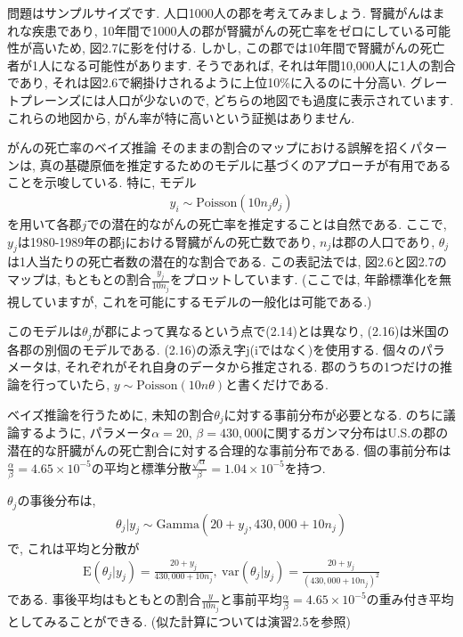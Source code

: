 \documentclass[10pt,dvipdfmx,a4]{beamer}
\newcommand{\eq}[1]{\begin{align}#1\end{align}}
\newcommand{\eqn}[1]{\begin{align*}#1\end{align*}}
\begin{document}
\begin{frame}
問題はサンプルサイズです.
人口1000人の郡を考えてみましょう.
腎臓がんはまれな疾患であり, 10年間で1000人の郡が腎臓がんの死亡率をゼロにしている可能性が高いため,  図2.7に影を付ける.
しかし, この郡では10年間で腎臓がんの死亡者が1人になる可能性があります.
そうであれば, それは年間10,000人に1人の割合であり, それは図2.6で網掛けされるように上位10\%に入るのに十分高い.
グレートプレーンズには人口が少ないので, どちらの地図でも過度に表示されています.
これらの地図から, がん率が特に高いという証拠はありません.
\end{frame}


\begin{frame}{がんの死亡率のベイズ推論}
そのままの割合のマップにおける誤解を招くパターンは, 真の基礎原価を推定するためのモデルに基づくのアプローチが有用であることを示唆している.
特に, モデル
\eq{y_i\sim\text{Poisson}(10n_j\theta_j)}
を用いて各郡$j$での潜在的ながんの死亡率を推定することは自然である.
ここで, $y_j$は1980-1989年の郡jにおける腎臓がんの死亡数であり, $n_j$は郡の人口であり, $\theta_j$は1人当たりの死亡者数の潜在的な割合である.
この表記法では, 図2.6と図2.7のマップは, もともとの割合$\frac{y_j}{10n_j}$をプロットしています.
(ここでは, 年齢標準化を無視していますが, これを可能にするモデルの一般化は可能である.)

このモデルは$\theta_j$が郡によって異なるという点で(2.14)とは異なり, (2.16)は米国の各郡の別個のモデルである.
(2.16)の添え字j(iではなく)を使用する.
個々のパラメータは, それぞれがそれ自身のデータから推定される.
郡のうちの1つだけの推論を行っていたら, $y\sim\text{Poisson}(10n\theta)$と書くだけである.
\end{frame}


\begin{frame}
ベイズ推論を行うために, 未知の割合$\theta_j$に対する事前分布が必要となる.
のちに議論するように, パラメータ$\alpha=20$, $\beta=430,000$に関するガンマ分布はU.S.の郡の潜在的な肝臓がんの死亡割合に対する合理的な事前分布である.
個の事前分布は$\tfrac{\alpha}{\beta}=4.65\times 10^{-5}$の平均と標準分散$\tfrac{\sqrt{\alpha}}{\beta}=1.04\times10^{-5}$を持つ.

$\theta_j$の事後分布は,
\eqn{\theta_j|y_j\sim\text{Gamma}(20+y_j,430,000+10n_j)}
で, これは平均と分散が
\eqn{\text{E}(\theta_j|y_j)=\frac{20+y_j}{430,000+10n_j},\ \text{var}(\theta_j|y_j)=\frac{20+y_j}{(430,000+10n_j)^2}}
である.
事後平均はもともとの割合$\tfrac{y}{10n_j}$と事前平均$\tfrac{\alpha}{\beta}=4.65\times 10^{-5}$の重み付き平均としてみることができる.
(似た計算については演習2.5を参照)
\end{frame}
\end{document}
